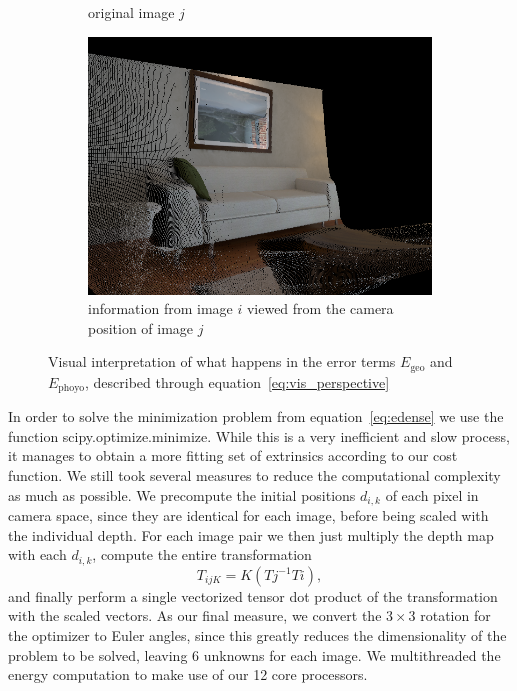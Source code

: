 \begin{figure}[ht]
\begin{subfigure}[b]{.45\textwidth}
                \caption{original image $j$}
                \label{sfig:j_original}
            \end{subfigure}
            \begin{subfigure}[b]{.45\textwidth}
                \includegraphics[width=.95\textwidth]{images/vis_perspective_02}
                \caption{information from image $i$ viewed from the camera position of image $j$}
                \label{sfig:i_from_j}
            \end{subfigure}
            \caption[]{Visual interpretation of what happens in the error terms $E_{\text{geo}}$ and $E_{\text{phoyo}}$, described through equation~\ref{eq:vis_perspective}}
            \label{fig:vis_perspective}
        \end{figure}
        In order to solve the minimization problem from equation~\ref{eq:edense} we use the function scipy.optimize.minimize.
        While this is a very inefficient and slow process, it manages to obtain a more fitting set of extrinsics according to our cost function.
        We still took several measures to reduce the computational complexity as much as possible.
        We precompute the initial positions $d_{i,k}$ of each pixel in camera space, since they are identical for each image, before being scaled with the individual depth.
        For each image pair we then just multiply the depth map with each $d_{i,k}$, compute the entire transformation
        \begin{equation}
            T_{ijK} = K(Tj^{-1}Ti),
        \end{equation}
        and finally perform a single vectorized tensor dot product of the transformation with the scaled vectors.
        As our final measure, we convert the $3\times3$ rotation for the optimizer to Euler angles, since this greatly reduces the dimensionality of the problem to be solved, leaving 6 unknowns for each image.
        We multithreaded the energy computation to make use of our 12 core processors.

